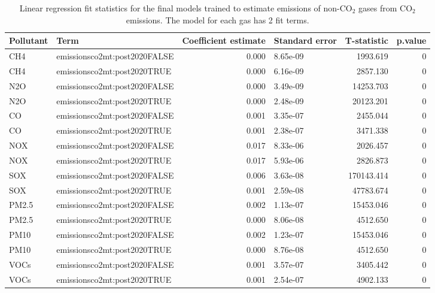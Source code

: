 \begin{table}[!h]
\centering
\caption{\label{tab:lm_other_gases_tidy_fit_stats}Linear regression fit statistics for the final models trained to estimate emissions of non-CO$_2$ gases from CO$_2$ emissions. The model for each gas has 2 fit terms.}
\centering
\fontsize{7}{9}\selectfont
\begin{tabular}[t]{l|l|r|l|r|r}
\hline
Pollutant & Term & Coefficient estimate & Standard error & T-statistic & p.value\\
\hline
CH4 & emissionsco2mt:post2020FALSE & 0.000 & 8.65e-09 & 1993.619 & 0\\
\hline
CH4 & emissionsco2mt:post2020TRUE & 0.000 & 6.16e-09 & 2857.130 & 0\\
\hline
N2O & emissionsco2mt:post2020FALSE & 0.000 & 3.49e-09 & 14253.703 & 0\\
\hline
N2O & emissionsco2mt:post2020TRUE & 0.000 & 2.48e-09 & 20123.201 & 0\\
\hline
CO & emissionsco2mt:post2020FALSE & 0.001 & 3.35e-07 & 2455.044 & 0\\
\hline
CO & emissionsco2mt:post2020TRUE & 0.001 & 2.38e-07 & 3471.338 & 0\\
\hline
NOX & emissionsco2mt:post2020FALSE & 0.017 & 8.33e-06 & 2026.457 & 0\\
\hline
NOX & emissionsco2mt:post2020TRUE & 0.017 & 5.93e-06 & 2826.873 & 0\\
\hline
SOX & emissionsco2mt:post2020FALSE & 0.006 & 3.63e-08 & 170143.414 & 0\\
\hline
SOX & emissionsco2mt:post2020TRUE & 0.001 & 2.59e-08 & 47783.674 & 0\\
\hline
PM2.5 & emissionsco2mt:post2020FALSE & 0.002 & 1.13e-07 & 15453.046 & 0\\
\hline
PM2.5 & emissionsco2mt:post2020TRUE & 0.000 & 8.06e-08 & 4512.650 & 0\\
\hline
PM10 & emissionsco2mt:post2020FALSE & 0.002 & 1.23e-07 & 15453.046 & 0\\
\hline
PM10 & emissionsco2mt:post2020TRUE & 0.000 & 8.76e-08 & 4512.650 & 0\\
\hline
VOCs & emissionsco2mt:post2020FALSE & 0.001 & 3.57e-07 & 3405.442 & 0\\
\hline
VOCs & emissionsco2mt:post2020TRUE & 0.001 & 2.54e-07 & 4902.133 & 0\\
\hline
\end{tabular}
\end{table}
